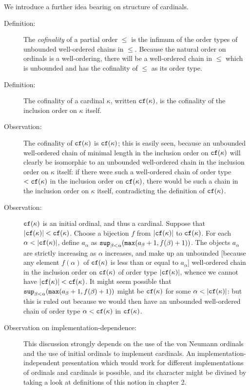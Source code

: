 \documentclass[12pt]{book}
\begin{document}
We introduce a further idea bearing on structure of cardinals.

\begin{description}

\item[Definition:]  The {\em cofinality\/} of a partial order $\leq$ is the infimum of the order types of unbounded well-ordered chains in $\leq$.  Because the natural order on ordinals is a well-ordering,
there will be a well-ordered chain in $\leq$ which is unbounded and has the cofinality of $\leq$ as its order type.

\item[Definition:]  The cofinality of a cardinal $\kappa$, written ${\tt cf}(\kappa)$, is the cofinality of the inclusion order on $\kappa$ itself. 

\item[Observation:]   The cofinality of ${\tt cf}(\kappa)$ is
${\tt cf}(\kappa)$;  this is easily seen, because an unbounded well-ordered chain of minimal length in the inclusion order on ${\tt cf}(\kappa)$ will clearly be isomorphic to an unbounded well-ordered chain in the inclusion order on $\kappa$ itself:  if there were such a well-ordered chain of order type $<{\tt cf}(\kappa)$ in the inclusion order on ${\tt cf}(\kappa)$, there would be such a chain in the inclusion order on $\kappa$ itself, contradicting the definition of ${\tt cf}(\kappa)$.

\item[Observation:]  ${\tt cf}(\kappa)$ is an initial ordinal, and thus a cardinal.   Suppose that $|{\tt cf}(\kappa)|<{\tt cf}(\kappa)$.  Choose a bijection $f$ from $|{\tt cf}(\kappa)|$ to ${\tt cf}(\kappa)$.  For each $\alpha<|{\tt cf}(\kappa)|$, define $a_{\alpha}$ as ${\tt sup}_{\beta<\alpha}({\tt max}(a_{\beta}+1,f(\beta)+1))$.  The objects $a_{\alpha}$ are strictly increasing as $\alpha$ increases, and make up an unbounded [because any element $f(\alpha)$ of ${\tt cf}(\kappa)$ is less than or equal to $a_{\alpha}$] well-ordered chain in the inclusion order on ${\tt cf}(\kappa)$ of order type $|{\tt cf}(\kappa)|$, whence we cannot have $|{\tt cf}(\kappa)|<{\tt cf}(\kappa)$.  It might seem possible that
${\tt sup}_{\beta<\alpha}({\tt max}(a_{\beta}+1,f(\beta)+1))$ might be ${\tt cf}(\kappa)$ for some $\alpha<|{\tt cf}(\kappa)|$:  but this is ruled out because we would then have an unbounded well-ordered chain of order type $\alpha<{\tt cf}(\kappa)$ in ${\tt cf}(\kappa)$.

\item[Observation on implementation-dependence:]  This discussion strongly depends on the use of the von Neumann ordinals and the use of initial ordinals to implement cardinals.
An implementation-independent presentation which would work for different implementations of ordinals and cardinals is possible, and its character might be divined by taking a look at definitions of this notion in chapter 2.


\end{description}
\end{document}
